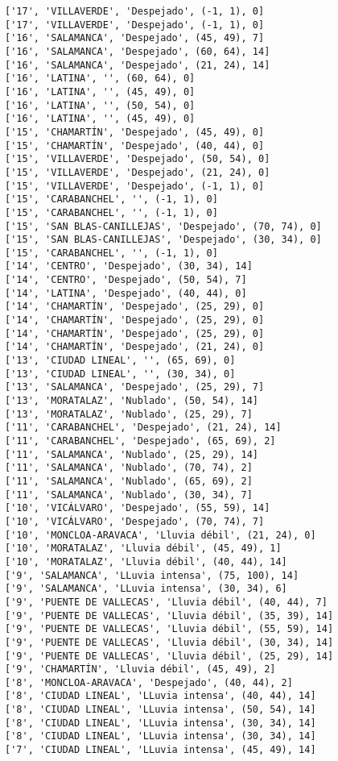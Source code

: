 \documentclass[11pt]{article}
\begin{document}
\begin{Verbatim}[commandchars=\\\{\}]
['17', 'VILLAVERDE', 'Despejado', (-1, 1), 0]
['17', 'VILLAVERDE', 'Despejado', (-1, 1), 0]
['16', 'SALAMANCA', 'Despejado', (45, 49), 7]
['16', 'SALAMANCA', 'Despejado', (60, 64), 14]
['16', 'SALAMANCA', 'Despejado', (21, 24), 14]
['16', 'LATINA', '', (60, 64), 0]
['16', 'LATINA', '', (45, 49), 0]
['16', 'LATINA', '', (50, 54), 0]
['16', 'LATINA', '', (45, 49), 0]
['15', 'CHAMARTÍN', 'Despejado', (45, 49), 0]
['15', 'CHAMARTÍN', 'Despejado', (40, 44), 0]
['15', 'VILLAVERDE', 'Despejado', (50, 54), 0]
['15', 'VILLAVERDE', 'Despejado', (21, 24), 0]
['15', 'VILLAVERDE', 'Despejado', (-1, 1), 0]
['15', 'CARABANCHEL', '', (-1, 1), 0]
['15', 'CARABANCHEL', '', (-1, 1), 0]
['15', 'SAN BLAS-CANILLEJAS', 'Despejado', (70, 74), 0]
['15', 'SAN BLAS-CANILLEJAS', 'Despejado', (30, 34), 0]
['15', 'CARABANCHEL', '', (-1, 1), 0]
['14', 'CENTRO', 'Despejado', (30, 34), 14]
['14', 'CENTRO', 'Despejado', (50, 54), 7]
['14', 'LATINA', 'Despejado', (40, 44), 0]
['14', 'CHAMARTÍN', 'Despejado', (25, 29), 0]
['14', 'CHAMARTÍN', 'Despejado', (25, 29), 0]
['14', 'CHAMARTÍN', 'Despejado', (25, 29), 0]
['14', 'CHAMARTÍN', 'Despejado', (21, 24), 0]
['13', 'CIUDAD LINEAL', '', (65, 69), 0]
['13', 'CIUDAD LINEAL', '', (30, 34), 0]
['13', 'SALAMANCA', 'Despejado', (25, 29), 7]
['13', 'MORATALAZ', 'Nublado', (50, 54), 14]
['13', 'MORATALAZ', 'Nublado', (25, 29), 7]
['11', 'CARABANCHEL', 'Despejado', (21, 24), 14]
['11', 'CARABANCHEL', 'Despejado', (65, 69), 2]
['11', 'SALAMANCA', 'Nublado', (25, 29), 14]
['11', 'SALAMANCA', 'Nublado', (70, 74), 2]
['11', 'SALAMANCA', 'Nublado', (65, 69), 2]
['11', 'SALAMANCA', 'Nublado', (30, 34), 7]
['10', 'VICÁLVARO', 'Despejado', (55, 59), 14]
['10', 'VICÁLVARO', 'Despejado', (70, 74), 7]
['10', 'MONCLOA-ARAVACA', 'Lluvia débil', (21, 24), 0]
['10', 'MORATALAZ', 'Lluvia débil', (45, 49), 1]
['10', 'MORATALAZ', 'Lluvia débil', (40, 44), 14]
['9', 'SALAMANCA', 'LLuvia intensa', (75, 100), 14]
['9', 'SALAMANCA', 'LLuvia intensa', (30, 34), 6]
['9', 'PUENTE DE VALLECAS', 'Lluvia débil', (40, 44), 7]
['9', 'PUENTE DE VALLECAS', 'Lluvia débil', (35, 39), 14]
['9', 'PUENTE DE VALLECAS', 'Lluvia débil', (55, 59), 14]
['9', 'PUENTE DE VALLECAS', 'Lluvia débil', (30, 34), 14]
['9', 'PUENTE DE VALLECAS', 'Lluvia débil', (25, 29), 14]
['9', 'CHAMARTÍN', 'Lluvia débil', (45, 49), 2]
['8', 'MONCLOA-ARAVACA', 'Despejado', (40, 44), 2]
['8', 'CIUDAD LINEAL', 'LLuvia intensa', (40, 44), 14]
['8', 'CIUDAD LINEAL', 'LLuvia intensa', (50, 54), 14]
['8', 'CIUDAD LINEAL', 'LLuvia intensa', (30, 34), 14]
['8', 'CIUDAD LINEAL', 'LLuvia intensa', (30, 34), 14]
['7', 'CIUDAD LINEAL', 'LLuvia intensa', (45, 49), 14]

\end{Verbatim}
\end{document}
